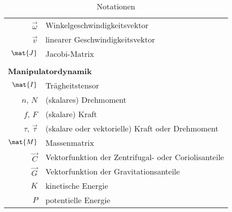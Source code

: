 \begin{table}
\begin{tabular}{rl}
			\(\vec{\omega}\)                                                   & Winkelgeschwindigkeitsvektor                                      \\
			\(\vec{v}\)                                                        & linearer Geschwindigkeitsvektor                                   \\
			\(\mat{J}\)                                                        & Jacobi-Matrix \\&                                                 \\
			\multicolumn{2}{l}{\textbf{Manipulatordynamik}}                                                                                        \\
			\(\mat{I}\)                                                        & Trägheitstensor                                                   \\
			\(n\), \(N\)                                                       & (skalares) Drehmoment                                             \\
			\(f\), \(F\)                                                       & (skalare) Kraft                                                   \\
			\(\tau\), \(\vec{\tau}\)                                           & (skalare oder vektorielle) Kraft oder Drehmoment                  \\
			\(\mat{M}\)                                                        & Massenmatrix                                                      \\
			\(\vec{C}\)                                                        & Vektorfunktion der Zentrifugal- oder Coriolisanteile              \\
			\(\vec{G}\)                                                        & Vektorfunktion der Gravitationsanteile                            \\
			\(K\)                                                              & kinetische Energie                                                \\
			\(P\)                                                              & potentielle Energie
		\end{tabular}
		\caption{Notationen}
		\label{tab:notation}
	\end{table}
